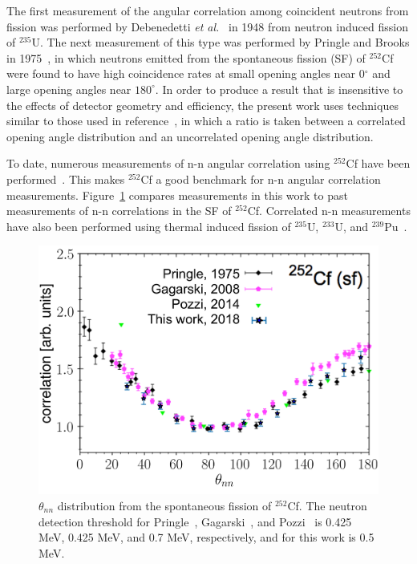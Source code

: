 The first measurement of the angular correlation among coincident neutrons from fission was performed by Debenedetti \emph{et al.}~\cite{1948twoNCorr} in 1948 from neutron induced fission of $^{235}\text{U}$.
The next measurement of this type was performed by Pringle and Brooks in 1975~\cite{1975Cf252}, in which neutrons emitted from the spontaneous fission (SF) of $^{252}$Cf were found to have high coincidence rates at small opening angles near 0$^{\circ}$ and large opening angles near $180^{\circ}$.
In order to produce a result that is insensitive to the effects of detector geometry and efficiency, the present work uses techniques similar to those used in reference~\cite{1975Cf252}, in which a ratio is taken between a correlated opening angle distribution and an uncorrelated opening angle distribution.

To date, numerous measurements of n-n angular correlation using $^{252}$Cf have been performed~\cite{Verbeke2018, Pozzi2014, 2008CF252, 1975Cf252}.
This makes $^{252}$Cf a good benchmark for n-n angular correlation measurements.
Figure~\ref{fig:Cf252_us_vs_them} compares measurements in this work to past measurements of n-n correlations in the SF of $^{252}$Cf.
Correlated n-n measurements have also been performed using thermal induced fission of $^{235}$U, $^{233}$U, and $^{239}$Pu~\cite{Sokolov2010}.
\begin{figure}[h]
\centering
\includegraphics[width=\figsmall\textwidth]{Cf252_us_vs_them.png}
\caption{$\theta_{nn}$ distribution from the spontaneous fission of $^{252}$Cf.
 The neutron detection threshold for Pringle~\cite{1975Cf252}, Gagarski~\cite{2008CF252}, and Pozzi~\cite{Pozzi2016} is 0.425 MeV, 0.425 MeV, and 0.7 MeV, respectively, and for this work is 0.5 MeV.
}
\label{fig:Cf252_us_vs_them}
\end{figure}

